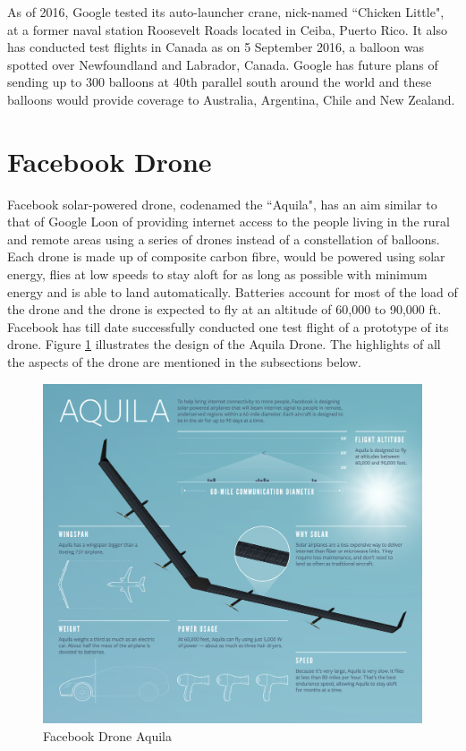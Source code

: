 \documentclass{llncs}
\begin{document}
	As of 2016, Google tested its auto-launcher crane, nick-named ``Chicken Little", at a former naval station Roosevelt Roads located in Ceiba, Puerto Rico\cite{google_balloon_autolauncher}. It also has conducted test flights in Canada as on 5 September 2016, a balloon was spotted over Newfoundland and Labrador, Canada. Google has future plans of sending up to 300 balloons at 40th parallel south around the world and these balloons would provide coverage to Australia, Argentina, Chile and New Zealand.    	
	  
	
	\section{Facebook Drone}
	Facebook solar-powered drone, codenamed the ``Aquila"\cite{drone_zuckerberg}, has an aim similar to that of Google Loon of 
	providing internet access to the people living in the rural and remote areas using a series of drones 
	instead of a constellation of balloons. Each drone is made up of composite carbon fibre, would be powered using solar energy, flies at low 
	speeds to stay aloft for as long as possible with minimum energy and is able to land automatically. Batteries account for most of the load 
	of the drone and the drone is expected
	to fly at an altitude of 60,000 to 90,000 ft. Facebook has till date successfully conducted one test flight of a prototype of its 
	drone. Figure \ref{fig:facebook_aquila} illustrates the design of the Aquila Drone. The highlights of all the aspects of the drone are 
	mentioned in the	subsections below.     
	
	\begin{figure}[H]
	\centering
	\includegraphics[width=1.0\textwidth]{fig4}
	\caption{Facebook Drone Aquila}
	\label{fig:facebook_aquila}
    \end{figure}
    
\end{document}
